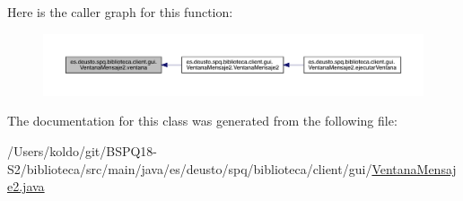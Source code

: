 Here is the caller graph for this function\+:
\nopagebreak
\begin{figure}[H]
\begin{center}
\leavevmode
\includegraphics[width=350pt]{classes_1_1deusto_1_1spq_1_1biblioteca_1_1client_1_1gui_1_1_ventana_mensaje2_a58e122a68c01e47a8ef6f9e9e2d54ca3_icgraph}
\end{center}
\end{figure}


The documentation for this class was generated from the following file\+:\begin{DoxyCompactItemize}
\item 
/\+Users/koldo/git/\+B\+S\+P\+Q18-\/\+S2/biblioteca/src/main/java/es/deusto/spq/biblioteca/client/gui/\mbox{\hyperlink{_ventana_mensaje2_8java}{Ventana\+Mensaje2.\+java}}\end{DoxyCompactItemize}
